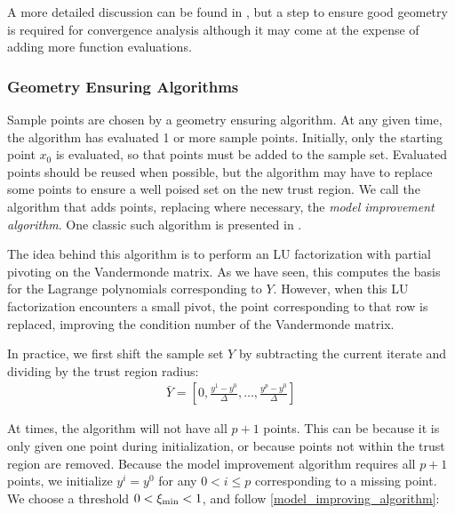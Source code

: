 A more detailed discussion can be found in \cite{doi:10.1080/10556780802409296}, but a step to ensure good geometry is required for convergence analysis although it may come at the expense of adding more function evaluations.

\subsubsection{Geometry Ensuring Algorithms}

Sample points are chosen by a geometry ensuring algorithm.
At any given time, the algorithm has evaluated 1 or more sample points.
Initially, only the starting point $x_0$ is evaluated, so that points must be added to the sample set.
Evaluated points should be reused when possible, but the algorithm may have to replace some points to ensure a well poised set on the new trust region.
We call the algorithm that adds points, replacing where necessary, the \emph{model improvement algorithm}.
One classic such algorithm is presented in \cite{DUMMY:intro_book}.

The idea behind this algorithm is to perform an LU factorization with partial pivoting on the Vandermonde matrix.
As we have seen, this computes the basis for the Lagrange polynomials corresponding to $Y$.
However, when this LU factorization encounters a small pivot, the point corresponding to that row is replaced, improving the condition number of the Vandermonde matrix.

In practice, we first shift the sample set $Y$ by subtracting the current iterate and dividing by the trust region radius:
\begin{align}
\bar{Y} = [0, \frac{y^1 - y^0}{\Delta}, \ldots, \frac{y^p - y^0}{\Delta}]
\end{align}

At times, the algorithm will not have all $p+1$ points.
This can be because it is only given one point during initialization, or because points not within the trust region are removed.
Because the model improvement algorithm requires all $p+1$ points, we initialize $y^i = y^0$ for any $0 < i \le p$ corresponding to a missing point.
We choose a threshold $0 < \xi_{\text{min}} < 1$, and follow \cref{model_improving_algorithm}:

